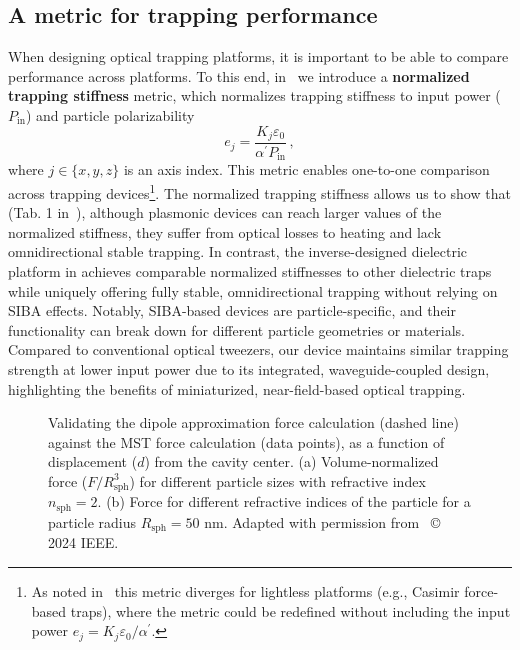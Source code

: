 \subsection*{A metric for trapping performance~\cite{ownpub1}}

When designing optical trapping platforms, it is important to be able to compare performance across platforms. To this end, in~\cite{ownpub3} we introduce a \textbf{normalized
trapping stiffness} metric, which normalizes trapping stiffness to input power ($P_\text{in}$) and particle  polarizability
\begin{equation}
 e_j=\frac{K_j \varepsilon_0}{\alpha^\prime P_{\text{in}}}\,,
\end{equation}
where $j \in \lbrace x,y,z \rbrace$ is an axis index. This metric enables one-to-one comparison across trapping devices\footnote{As noted in~\cite{ownpub3} this metric diverges for lightless platforms (e.g., Casimir force-based traps), where the metric could be redefined
without including the input power $e_j=K_j \varepsilon_0/\alpha^\prime$.}. The normalized trapping stiffness allows us to show that (Tab. 1 in~\cite{ownpub3}), although plasmonic devices can reach larger values of the normalized 
stiffness, they suffer from optical losses to heating and lack omnidirectional stable trapping. In contrast, the inverse-designed dielectric platform in 
 achieves comparable normalized stiffnesses to other dielectric traps while uniquely offering fully stable, omnidirectional trapping
 without relying on SIBA effects. Notably, SIBA-based devices are particle-specific, and their functionality can break down
 for different particle geometries or materials. Compared to conventional optical tweezers, our device maintains similar trapping
 strength at lower input power due to its integrated, waveguide-coupled design, highlighting the benefits of miniaturized,
 near-field-based optical trapping.

 \begin{figure}[tb]
    \centering
    \caption{Validating the dipole approximation force calculation (dashed line) against the MST force calculation (data points), as a function of displacement ($d$) from the cavity center.
    (a) Volume-normalized force ($F/R^3_\text{sph}$) for different particle sizes with refractive index $n_\text{sph}=2$. (b) Force for different refractive indices of the particle for a particle radius $R_\text{sph}=50$ nm. Adapted with permission from~\cite{ownpub3} © 2024 IEEE.}
    \label{fig:SPIE}
\end{figure}

